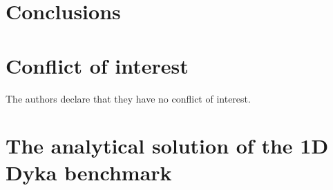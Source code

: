




\section{Conclusions}
\label{sec:conclusions}


%
\section*{Conflict of interest}
%
The authors declare that they have no conflict of interest.


\appendix
\section{The analytical solution of the 1D Dyka benchmark}
\label{app:analytical_sol}

